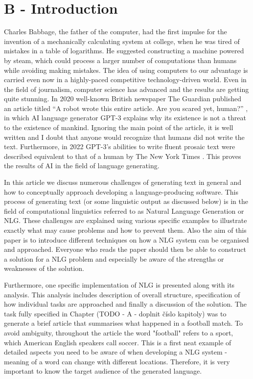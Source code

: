 \chapter*{B - Introduction}

Charles Babbage, the father of the computer, had the first impulse for the invention of a mechanically calculating system at college, when he was tired of mistakes in a table of logarithms. He suggested constructing a machine powered by steam, which could process a larger number of computations than humans while avoiding making mistakes. The idea of using computers to our advantage is carried even now in a highly-paced competitive technology-driven world. Even in the field of journalism, computer science has advanced and the results are getting quite stunning. In 2020  well-known British newspaper The Guardian published an article titled “A robot wrote this entire article. Are you scared yet, human?” \cite{gpt32020robot}, in which AI language generator GPT-3 explains why its existence is not a threat to the existence of mankind. Ignoring the main point of the article, it is well written and I doubt that anyone would recognize that humans did not write the text. Furthermore, in 2022 GPT-3's abilities to write fluent prosaic text were described equivalent to that of a human by The New York Times \cite{johnson2022ai}. This proves the results of AI in the field of language generating.

In this article we discuss numerous challenges of generating text in general and how to conceptually approach developing a language-producing software. This process of generating text (or some linguistic output as discussed below) is in the field of computational linguistics referred to as Natural Language Generation or NLG. These challenges are explained using various specific examples to illustrate exactly what may cause problems and how to prevent them. Also the aim of this paper is to introduce different techniques on how a NLG system can be organised and approached. Everyone who reads the paper should then be able to construct a solution for a NLG problem and especially be aware of the strengths or weaknesses of the solution.

Furthermore, one specific implementation of NLG is presented along with its analysis. This analysis includes description of overall structure, specification of how individual tasks are approached and finally a discussion of the solution. The task fully specified in Chapter (TODO - A - doplnit číslo kapitoly) was to generate a brief article that summarises what happened in a football match. To avoid ambiguity, throughout the article the word "football" refers to a sport, which American English speakers call soccer. This is a first neat example of detailed aspects you need to be aware of when developing a NLG system - meaning of a word can change with different locations. Therefore, it is very important to know the target audience of the generated language. 



